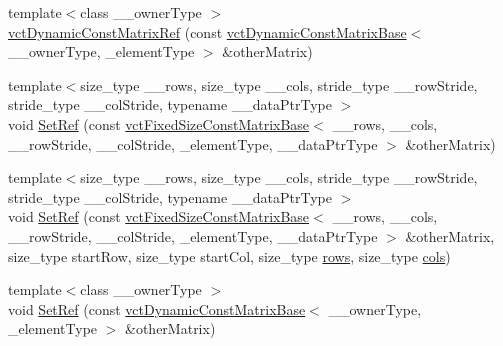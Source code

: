 \begin{DoxyCompactItemize}
\item 
{\footnotesize template$<$class \+\_\+\+\_\+owner\+Type $>$ }\\\hyperlink{classvct_dynamic_const_matrix_ref_a69f3ea1f5abeb8a3cd1d418c541f6e8c}{vct\+Dynamic\+Const\+Matrix\+Ref} (const \hyperlink{classvct_dynamic_const_matrix_base}{vct\+Dynamic\+Const\+Matrix\+Base}$<$ \+\_\+\+\_\+owner\+Type, \+\_\+element\+Type $>$ \&other\+Matrix)
\item 
{\footnotesize template$<$size\+\_\+type \+\_\+\+\_\+rows, size\+\_\+type \+\_\+\+\_\+cols, stride\+\_\+type \+\_\+\+\_\+row\+Stride, stride\+\_\+type \+\_\+\+\_\+col\+Stride, typename \+\_\+\+\_\+data\+Ptr\+Type $>$ }\\void \hyperlink{classvct_dynamic_const_matrix_ref_a7fd497624ca76b2c666049323b1fc7fa}{Set\+Ref} (const \hyperlink{classvct_fixed_size_const_matrix_base}{vct\+Fixed\+Size\+Const\+Matrix\+Base}$<$ \+\_\+\+\_\+rows, \+\_\+\+\_\+cols, \+\_\+\+\_\+row\+Stride, \+\_\+\+\_\+col\+Stride, \+\_\+element\+Type, \+\_\+\+\_\+data\+Ptr\+Type $>$ \&other\+Matrix)
\item 
{\footnotesize template$<$size\+\_\+type \+\_\+\+\_\+rows, size\+\_\+type \+\_\+\+\_\+cols, stride\+\_\+type \+\_\+\+\_\+row\+Stride, stride\+\_\+type \+\_\+\+\_\+col\+Stride, typename \+\_\+\+\_\+data\+Ptr\+Type $>$ }\\void \hyperlink{classvct_dynamic_const_matrix_ref_afb23e69c7cf3542416826bb6a5c02949}{Set\+Ref} (const \hyperlink{classvct_fixed_size_const_matrix_base}{vct\+Fixed\+Size\+Const\+Matrix\+Base}$<$ \+\_\+\+\_\+rows, \+\_\+\+\_\+cols, \+\_\+\+\_\+row\+Stride, \+\_\+\+\_\+col\+Stride, \+\_\+element\+Type, \+\_\+\+\_\+data\+Ptr\+Type $>$ \&other\+Matrix, size\+\_\+type start\+Row, size\+\_\+type start\+Col, size\+\_\+type \hyperlink{classvct_dynamic_const_matrix_base_a5eac13be2207ebeb8766cde379d73438}{rows}, size\+\_\+type \hyperlink{classvct_dynamic_const_matrix_base_aa6c51d41a100da49a7e7ac7edb20ecd9}{cols})
\item 
{\footnotesize template$<$class \+\_\+\+\_\+owner\+Type $>$ }\\void \hyperlink{classvct_dynamic_const_matrix_ref_ae76ec58a0046efd4b7efe4b07646fffd}{Set\+Ref} (const \hyperlink{classvct_dynamic_const_matrix_base}{vct\+Dynamic\+Const\+Matrix\+Base}$<$ \+\_\+\+\_\+owner\+Type, \+\_\+element\+Type $>$ \&other\+Matrix)
\end{DoxyCompactItemize}
{\bf }\par
